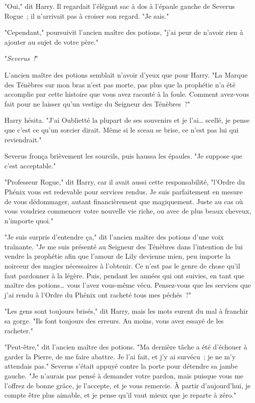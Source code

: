 "Oui," dit Harry. Il regardait l'élégant sac à dos à l'épaule gauche de Severus Rogue~; il n'arrivait pas à croiser son regard. "Je sais."

"Cependant," poursuivit l'ancien maître des potions, "j'ai peur de n'avoir rien à ajouter au sujet de votre père."

"\emph{Severus~!}"

L'ancien maître des potions semblait n'avoir d'yeux que pour Harry. "La Marque des Ténèbres sur mon bras n'est pas morte, pas plus que la prophétie n'a été accomplie par cette histoire que vous avez raconté à la foule. Comment avez-vous fait pour ne laisser qu'un vestige du Seigneur des Ténèbres~?"

Harry hésita. "J'ai Oublietté la plupart de ses souvenirs et je l'ai… scellé, je pense que c'est ce qu'un sorcier dirait. Même si le sceau se brise, ce n'est pas lui qui reviendrait."

Severus fronça brièvement les sourcils, puis haussa les épaules. "Je suppose que c'est acceptable."

"Professeur Rogue," dit Harry, car il avait aussi cette responsabilité, "l'Ordre du Phénix vous est redevable pour services rendus. Je suis parfaitement en mesure de vous dédommager, autant financièrement que magiquement. Juste au cas où vous voudriez commencer votre nouvelle vie riche, ou avec de plus beaux cheveux, n'importe quoi."

"Je suis surpris d'entendre ça," dit l'ancien maître des potions d'une voix traînante. "Je me suis présenté au Seigneur des Ténèbres dans l'intention de lui vendre la prophétie afin que l'amour de Lily devienne mien, peu importe la noirceur des magies nécessaires à l'obtenir. Ce n'est pas le genre de chose qu'il faut pardonner à la légère. Puis, pendant les années qui ont suivies, en tant que maître des potions… vous l'avez vous-même vécu. Pensez-vous que les services que j'ai rendu à l'Ordre du Phénix ont racheté tous mes péchés~?"

"Les gens sont toujours brisés," dit Harry, mais les mots eurent du mal à franchir sa gorge. "Ils font toujours des erreurs. Au moins, vous avez essayé de les racheter."

"Peut-être," dit l'ancien maître des potions. "Ma dernière tâche a été d'échouer à garder la Pierre, de me faire abattre. Je l'ai fait, et j'y ai survécu~; je ne m'y attendais pas." Severus s'était appuyé contre la porte pour détendre sa jambe gauche. "Je n'aurais pas pensé à demander votre pardon, mais puisque vous me l'offrez de bonne grâce, je l'accepte, et je vous remercie. À partir d'aujourd'hui, je compte être plus aimable, et je pense qu'il vaut mieux que je reparte à zéro."

